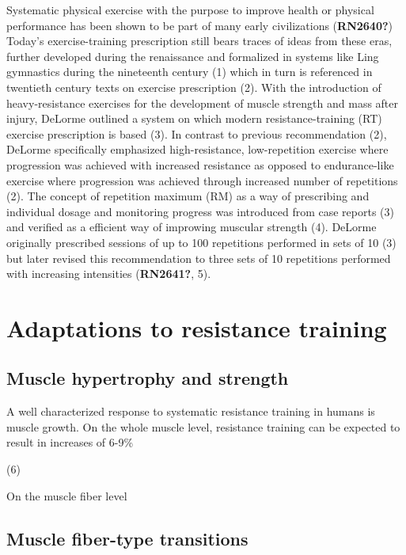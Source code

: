 \documentclass[twoside,10pt]{gihclass} %
\begin{document}
Systematic physical exercise with the purpose to improve health or physical performance has been shown to be part of many early civilizations
(\textbf{RN2640?})
Today's exercise-training prescription still bears traces of ideas from these eras, further developed during the renaissance and formalized in systems like Ling gymnastics during the nineteenth century
(1)
which in turn is referenced in twentieth century texts on exercise prescription
(2).
With the introduction of heavy-resistance exercises for the development of muscle strength and mass after injury, DeLorme outlined a system on which modern resistance-training (RT) exercise prescription is based (3).
In contrast to previous recommendation
(2),
DeLorme specifically emphasized high-resistance, low-repetition exercise where progression was achieved with increased resistance as opposed to endurance-like exercise where progression was achieved through increased number of repetitions
(2).
The concept of repetition maximum (RM) as a way of prescribing and individual dosage and monitoring progress was introduced from case reports (3) and verified as a efficient way of improwing muscular strength
(4).
DeLorme originally prescribed sessions of up to 100 repetitions performed in sets of 10 (3) but later revised this recommendation to three sets of 10 repetitions performed with increasing intensities
(\textbf{RN2641?}, 5).

\hypertarget{adaptations-to-resistance-training}{%
\section{Adaptations to resistance training}\label{adaptations-to-resistance-training}}

\hypertarget{muscle-hypertrophy-and-strength}{%
\subsection{Muscle hypertrophy and strength}\label{muscle-hypertrophy-and-strength}}

A well characterized response to systematic resistance training in humans is muscle growth. On the whole muscle level, resistance training can be expected to result in increases of 6-9\%

(6)

On the muscle fiber level

\hypertarget{muscle-fiber-type-transitions}{%
\subsection{Muscle fiber-type transitions}\label{muscle-fiber-type-transitions}}
\end{document}
